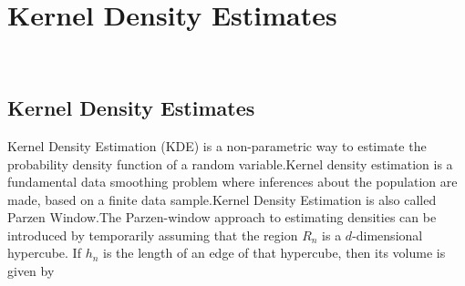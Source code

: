 
\chapter{Kernel Density Estimates}
\HRule \\[-0.5cm] %


\begin{spacing}{1.5}
%

\section{Kernel Density Estimates}



 Kernel Density Estimation (KDE) is a non-parametric way to estimate the probability density function of a random variable.Kernel density estimation is a fundamental data smoothing problem where inferences about the population are made, based on a finite data sample.Kernel Density Estimation is also called Parzen Window.The Parzen-window approach to estimating densities can be introduced by temporarily
assuming that the region $R_{n}$ is a $d$-dimensional hypercube. If $h_{n}$ is the length of an edge of that hypercube, then its volume is given by
                                                  

\end{spacing}
